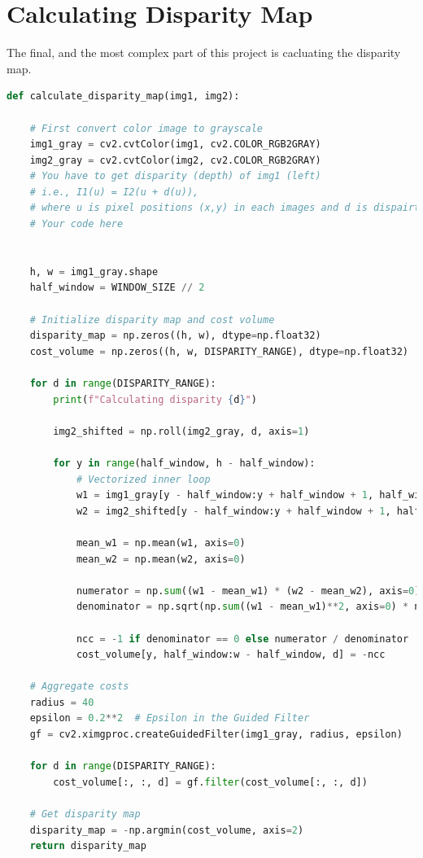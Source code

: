 \section*{Calculating Disparity Map}
The final, and the most complex part of this project is cacluating the disparity map.
\begin{lstlisting}[language=python]
def calculate_disparity_map(img1, img2):
    
    # First convert color image to grayscale
    img1_gray = cv2.cvtColor(img1, cv2.COLOR_RGB2GRAY)
    img2_gray = cv2.cvtColor(img2, cv2.COLOR_RGB2GRAY)
    # You have to get disparity (depth) of img1 (left)
    # i.e., I1(u) = I2(u + d(u)),
    # where u is pixel positions (x,y) in each images and d is dispairty map.
    # Your code here
    
    
    h, w = img1_gray.shape
    half_window = WINDOW_SIZE // 2
    
    # Initialize disparity map and cost volume
    disparity_map = np.zeros((h, w), dtype=np.float32)
    cost_volume = np.zeros((h, w, DISPARITY_RANGE), dtype=np.float32)  

    for d in range(DISPARITY_RANGE):
        print(f"Calculating disparity {d}")

        img2_shifted = np.roll(img2_gray, d, axis=1)

        for y in range(half_window, h - half_window):
            # Vectorized inner loop
            w1 = img1_gray[y - half_window:y + half_window + 1, half_window:w - half_window]
            w2 = img2_shifted[y - half_window:y + half_window + 1, half_window:w - half_window]
            
            mean_w1 = np.mean(w1, axis=0)
            mean_w2 = np.mean(w2, axis=0)
            
            numerator = np.sum((w1 - mean_w1) * (w2 - mean_w2), axis=0)
            denominator = np.sqrt(np.sum((w1 - mean_w1)**2, axis=0) * np.sum((w2 - mean_w2)**2, axis=0))

            ncc = -1 if denominator == 0 else numerator / denominator
            cost_volume[y, half_window:w - half_window, d] = -ncc

    # Aggregate costs
    radius = 40
    epsilon = 0.2**2  # Epsilon in the Guided Filter
    gf = cv2.ximgproc.createGuidedFilter(img1_gray, radius, epsilon)

    for d in range(DISPARITY_RANGE):
        cost_volume[:, :, d] = gf.filter(cost_volume[:, :, d])
    
    # Get disparity map
    disparity_map = -np.argmin(cost_volume, axis=2)
    return disparity_map
\end{lstlisting}

